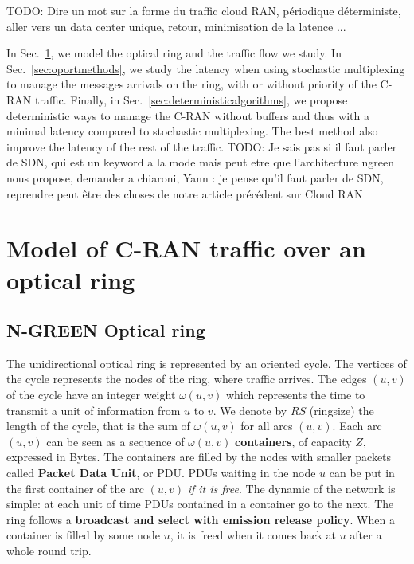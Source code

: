 \documentclass[]{algotel}
\newcommand{\todo}[1]{{\color{red} TODO: {#1}}}
\begin{document}
\todo{Dire un mot sur la forme du traffic cloud RAN, périodique déterministe, aller vers un data center unique, retour, minimisation de la latence ...}

In Sec.~\ref{sec:model}, we model the optical ring and the traffic flow we study. In Sec.~\ref{sec:oportmethods}, we study the latency when using stochastic multiplexing to manage the messages arrivals on the ring, with or without priority of the C-RAN traffic. Finally, in Sec.~\ref{sec:deterministicalgorithms}, we propose deterministic ways to manage the C-RAN without buffers and thus with a minimal latency compared to stochastic multiplexing. The best method also improve the latency of the rest of the traffic.
\todo{Je sais pas si il faut parler de SDN, qui est un keyword a la mode mais peut etre que l'architecture ngreen nous propose, demander a chiaroni, 
Yann : je pense qu'il faut parler de SDN, reprendre peut être des choses de notre article précédent sur Cloud RAN}


\section{Model of C-RAN traffic over an optical ring}
\label{sec:model}
% 
% 
          
  \subsection{N-GREEN Optical ring}
   
  The unidirectional optical ring is represented by an oriented cycle. The vertices of the cycle represents the nodes of the ring, where traffic arrives. The edges $(u,v)$ of the cycle have an integer weight $\omega(u,v)$ which represents the time to transmit a unit of information from $u$ to $v$. We denote by $RS$ (ringsize) the length of the cycle, that is the sum of $\omega(u,v)$ for all arcs $(u,v)$.  Each arc $(u,v)$ can be seen as a sequence of $\omega(u,v)$ {\bf containers}, of capacity $Z$, expressed in Bytes.  The containers are filled  by the nodes with smaller packets called {\bf Packet Data Unit}, or PDU.
  PDUs waiting in the node $u$ can be put in the first container of the arc $(u,v)$ \emph{if it is free}. 
  The dynamic of the network is simple: at each unit of time PDUs contained in a container go to the next.
   The ring follows a {\bf broadcast and select with emission release policy}. When a container is filled by some node $u$,
   it is freed when it comes back at $u$ after a whole round trip.
   
\end{document}
